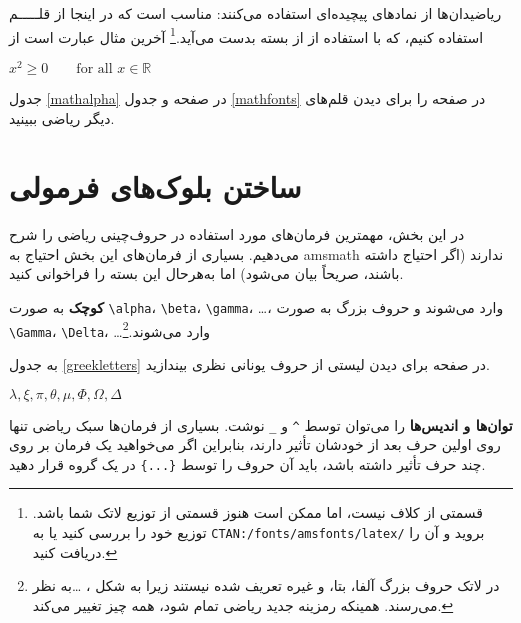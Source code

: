 ریاضیدان‌ها از نمادهای پیچیده‌ای استفاده می‌کنند: مناسب است که در اینجا از قلـــــم  استفاده کنیم، 
 که با استفاده از  از بسته   بدست می‌آید.\footnote{ قسمتی از کلاف \lr{} نیست، اما ممکن است هنوز قسمتی از توزیع لاتک شما باشد. توزیع خود را بررسی کنید یا به  \texttt{CTAN:/fonts/amsfonts/latex/} بروید و آن را دریافت کنید.}
\ifx\mathbb\undefined\else
آخرین مثال عبارت است از

\begin{example}
$x^{2} \geq 0\qquad
 \text{for all } x 
 \in \mathbb{R}$
\end{example}
\fi

جدول 
\ref{mathalpha}
 در صفحه 
\pageref{mathalpha}
و جدول  
\ref{mathfonts}
در صفحه
\pageref{mathfonts}
را برای دیدن قلم‌های دیگر ریاضی ببینید.

\section{ساختن بلوک‌های فرمولی}

در این بخش، مهمترین فرمان‌های مورد استفاده در حروف‌چینی ریاضی را شرح می‌دهیم. بسیاری از فرمان‌های این بخش احتیاج به 
\textsf{amsmath} ندارند 
(اگر احتیاج داشته باشند، صریحاً بیان می‌شود)
اما به‌هر‌حال این بسته را فراخوانی کنید.


\textbf{کوچک} 
به‌ صورت \verb|\alpha|،  \verb|\beta|، \verb|\gamma|، \ldots، وارد می‌شوند و حروف بزرگ به صورت  \verb|\Gamma|، \verb|\Delta|، \ldots وارد می‌شوند.\footnote{در لاتک حروف بزرگ آلفا، بتا، و غیره تعریف شده نیستند زیرا به شکل ، \ldots به نظر می‌رسند. همینکه رمزینه جدید ریاضی تمام شود، همه چیز تغییر می‌کند.}

به جدول  
\ref{greekletters}
در صفحه 
\pageref{greekletters} برای دیدن لیستی از حروف یونانی نظری بیندازید.
\begin{example}
$\lambda,\xi,\pi,\theta,
 \mu,\Phi,\Omega,\Delta$
\end{example}


\textbf{توان‌ها و اندیس‌ها}
را می‌توان توسط 
\verb|^|
 و 
\verb|_|%
 نوشت.
بسیاری از فرمان‌ها سبک ریاضی تنها روی اولین حرف بعد از خودشان تأثیر دارند، بنابراین اگر می‌خواهید یک فرمان بر روی چند حرف تأثیر داشته باشد، باید آن حروف را توسط  \verb|{...}| در یک گروه قرار دهید.

